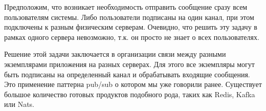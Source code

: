 Предположим, что возникает необходимость отправить сообщение сразу всем пользователям системы. Либо пользователи подписаны на один канал, при этом подключены к разным физическим серверам. Очевидно, что решить эту задачу в рамках одного сервера невозможно, т.к. он просто не знает о всех пользователях.

Решение этой задачи заключается в организации связи между разными экземплярами приложения на разных серверах. Для этого все экземпляры могут быть подписаны на определенный канал и обрабатывать входящие сообщения. Это применение паттерна pub/sub о котором мы уже говорили ранее. Существует большое количество готовых продуктов подобного рода, таких как Redis, Kafka или Nats.